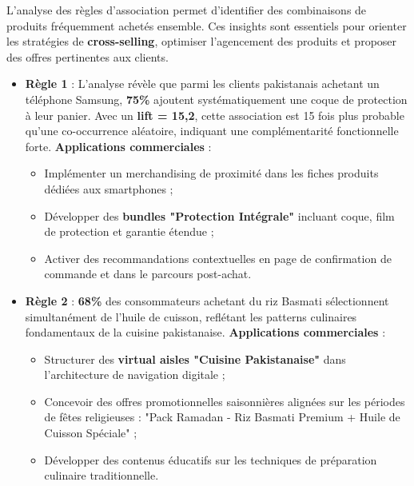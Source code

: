 \documentclass[a4paper,12pt]{article}
\begin{document}
L’analyse des règles d’association permet d’identifier des combinaisons de produits fréquemment achetés ensemble. 
Ces insights sont essentiels pour orienter les stratégies de \textbf{cross-selling}, optimiser l’agencement des produits 
et proposer des offres pertinentes aux clients.  
\begin{itemize}
    \item \textbf{Règle 1} :  
    L'analyse révèle que parmi les clients pakistanais achetant un téléphone Samsung, \textbf{75\%} ajoutent systématiquement une coque de protection à leur panier.  
    Avec un \textbf{lift = 15,2}, cette association est 15 fois plus probable qu'une co-occurrence aléatoire, indiquant une complémentarité fonctionnelle forte.  
    \textbf{Applications commerciales} :  
    \begin{itemize}
        \item Implémenter un merchandising de proximité dans les fiches produits dédiées aux smartphones ;
        \item Développer des \textbf{bundles "Protection Intégrale"} incluant coque, film de protection et garantie étendue ;
        \item Activer des recommandations contextuelles en page de confirmation de commande et dans le parcours post-achat.
    \end{itemize}

    \item \textbf{Règle 2} :  
    \textbf{68\%} des consommateurs achetant du riz Basmati sélectionnent simultanément de l'huile de cuisson, reflétant les patterns culinaires fondamentaux de la cuisine pakistanaise.  
    \textbf{Applications commerciales} :  
    \begin{itemize}
        \item Structurer des \textbf{virtual aisles "Cuisine Pakistanaise"} dans l'architecture de navigation digitale ;
        \item Concevoir des offres promotionnelles saisonnières alignées sur les périodes de fêtes religieuses : "Pack Ramadan - Riz Basmati Premium + Huile de Cuisson Spéciale" ;
        \item Développer des contenus éducatifs sur les techniques de préparation culinaire traditionnelle.
    \end{itemize}


\end{itemize}
\end{document}
